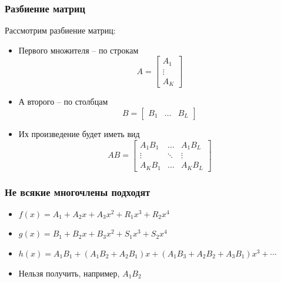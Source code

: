 \documentclass{beamer}
\begin{document}
    \begin{frame}
        
        \frametitle{Разбиение матриц}
        Рассмотрим разбиение матриц:
        \begin{itemize}
            \item<1-> Первого множителя -- по строкам
            \begin{equation*}
                A = 
                \begin{bmatrix}
                    A_1 \\ \vdots \\ A_K
                \end{bmatrix}
            \end{equation*}
            \item<2-> А второго -- по столбцам
            \begin{equation*}
                B = 
                \begin{bmatrix}
                    B_1 & \dots & B_L
                \end{bmatrix}
            \end{equation*}
            \item<3-> Их произведение будет иметь вид
            \begin{equation*}
                AB =
                \begin{bmatrix}
                    A_1B_1 & \dots & A_1B_L \\
                    \vdots & \ddots & \vdots \\
                    A_K B_1 & \dots & A_K B_L
                \end{bmatrix}
            \end{equation*}
            \end{itemize}
    \end{frame}

    \begin{frame}
        \frametitle{Не всякие многочлены подходят}
        \begin{itemize}
            \item<1-> $f(x) = A_1 + A_2x + A_3x^2 + R_1x^3 + R_2x^4$
            \item<2-> $g(x) = B_1 + B_2x + B_3x^2 + S_1x^3 + S_2x^4$
            \item<3-> $h(x) = A_1B_1 + \left(A_1B_2 + A_2B_1\right)x + \left(A_1B_3 + A_2B_2 + A_3B_1\right)x^3 + \cdots$
            \item<4-> Нельзя получить, например, $A_1B_2$
        \end{itemize}
    \end{frame}
    
\end{document}
